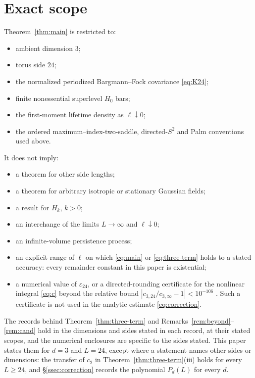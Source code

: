 \section{Exact scope}\label{sec:scope}

Theorem~\ref{thm:main} is restricted to:
\begin{itemize}[leftmargin=2em]
\item ambient dimension $3$;
\item torus side $24$;
\item the normalized periodized Bargmann--Fock covariance \eqref{eq:K24};
\item finite nonessential superlevel $H_0$ bars;
\item the first-moment lifetime density as $\ell\downarrow0$;
\item the ordered maximum--index-two-saddle, directed-$S^2$ and Palm conventions used above.
\end{itemize}
It does not imply:
\begin{itemize}[leftmargin=2em]
\item a theorem for other side lengths;
\item a theorem for arbitrary isotropic or stationary Gaussian fields;
\item a result for $H_k$, $k>0$;
\item an interchange of the limits $L\to\infty$ and $\ell\downarrow0$;
\item an infinite-volume persistence process;
\item an explicit range of $\ell$ on which \eqref{eq:main} or \eqref{eq:three-term} holds to a stated accuracy: every remainder constant in this paper is existential;
\item a numerical value of $\varepsilon_{24}$, or a directed-rounding certificate for the nonlinear integral \eqref{eq:c} beyond the relative bound $|c_{3,24}/c_{3,\infty}-1|<10^{-106}$ . Such a certificate is not used in the analytic estimate \eqref{eq:correction}.
\end{itemize}
The records behind Theorem~\ref{thm:three-term} and Remarks~\ref{rem:beyond}--\ref{rem:cand} hold in the dimensions and sides stated in each record, at their stated scopes, and the numerical enclosures are specific to the sides stated. This paper states them for $d=3$ and $L=24$, except where a statement names other sides or dimensions: the transfer of $c_2$ in Theorem~\ref{thm:three-term}(iii) holds for every $L\ge24$, and \S\ref{ssec:correction} records the polynomial $P_d(L)$ for every $d$.

